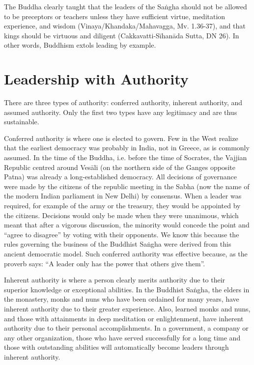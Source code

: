 \documentclass[11pt, openany]{book}
\begin{document}
The Buddha clearly taught that the leaders of the Saṅgha should not be allowed to be preceptors or teachers unless they have sufficient virtue, meditation experience, and wisdom (Vinaya/Khandaka/Mahavagga, Mv. 1.36-37), and that kings should be virtuous and diligent (Cakkavatti-Sīhanāda Sutta, DN 26). In other words, Buddhism extols leading by example.

\section{Leadership with Authority}

There are three types of authority: conferred authority, inherent authority, and assumed authority. Only the first two types have any legitimacy and are thus sustainable.

Conferred authority is where one is elected to govern. Few in the West realize that the earliest democracy was probably in India, not in Greece, as is commonly assumed. In the time of the Buddha, i.e. before the time of Socrates, the Vajjian Republic centred around Vesāli (on the northern side of the Ganges opposite Patna) was already a long-established democracy. All decisions of governance were made by the citizens of the republic meeting in the Sabha (now the name of the modern Indian parliament in New Delhi) by consensus. When a leader was required, for example of the army or the treasury, they would be appointed by the citizens. Decisions would only be made when they were unanimous, which meant that after a vigorous discussion, the minority would concede the point and “agree to disagree” by voting with their opponents. We know this because the rules governing the business of the Buddhist Saṅgha were derived from this ancient democratic model. Such conferred authority was effective because, as the proverb says: “A leader only has the power that others give them”.

Inherent authority is where a person clearly merits authority due to their superior knowledge or exceptional abilities. In the Buddhist Saṅgha, the elders in the monastery, monks and nuns who have been ordained for many years, have inherent authority due to their greater experience. Also, learned monks and nuns, and those with attainments in deep meditation or enlightenment, have inherent authority due to their personal accomplishments. In a government, a company or any other organization, those who have served successfully for a long time and those with outstanding abilities will automatically become leaders through inherent authority.
\end{document}
